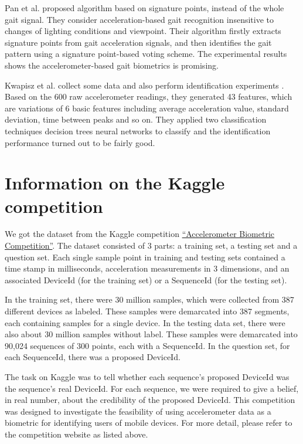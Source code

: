 \documentclass{article} %
\begin{document}
Pan et al. \cite{Pan:EL2009} proposed algorithm based on signature points, instead of the whole gait signal. They consider acceleration-based gait recognition insensitive to changes of lighting conditions and viewpoint. Their algorithm firstly extracts signature points from gait acceleration signals, and then identifies the gait pattern using a signature point-based voting scheme. The experimental results shows the accelerometer-based gait biometrics is promising. 

Kwapisz et al.\cite{Kwapisz:BTAS2009} collect some data and also perform identification experiments . Based on the 600 raw accelerometer readings, they generated 43 features, which are variations of 6 basic features including average acceleration value, standard deviation, time between peaks and so on. They applied two classification techniques decision trees neural networks to classify and the identification performance turned out to be fairly good.


\section{Information on the Kaggle competition}
We got the dataset from the Kaggle competition \href{http://www.kaggle.com/c/accelerometer-biometric-competition}{``Accelerometer Biometric Competition''}. The dataset consisted of 3 parts: a training set, a testing set and a question set. Each single sample point in training and testing sets contained a time stamp in milliseconds, acceleration measurements in 3 dimensions, and an associated DeviceId (for the training set) or a SequenceId (for the testing set). 

In the training set, there were 30 million samples, which were collected from 387 different devices as labeled. These samples were demarcated into 387 segments, each containing samples for a single device. In the testing data set, there were also about 30 million samples without label. These samples were demarcated into 90,024 sequences of 300 points, each with a SequenceId. In the question set, for each SequenceId, there was a proposed DeviceId.

The task on Kaggle was to tell whether each sequence's proposed DeviceId was the sequence's real DeviceId. For each sequence, we were required to give a belief, in real number, about the credibility of the proposed DeviceId. This competition was designed to investigate the feasibility of using accelerometer data as a biometric for identifying users of mobile devices. For more detail, please refer to the competition website as listed above.
\end{document}
